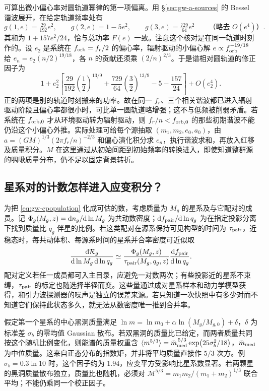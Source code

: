 可算出微小偏心率对圆轨道幂律的第一项偏离。用 \S\ref{sec:gw-a-sources} 的 Bessel 谐波展开，在给定轨道频率处有
\[
 g(1,e)=\tfrac{29}{192}e^2,\qquad
 g(2,e)=1-5e^2,\qquad
 g(3,e)=\tfrac{729}{64}e^2
 \qquad \text{（略去 }O(e^4)\text{）}.
\]
其和为 $1+157e^2/24$，恰与总功率 $F(e)$ 一致。注意这个核对是在同一轨道时刻作的。设 $e_2$ 是系统在 $f_{\rm orb}=f_r/2$ 的偏心率，辐射驱动的小偏心解 $e\propto f_{\rm orb}^{-19/18}$ 给 $e_n=e_2(n/2)^{19/18}$，各 $n$ 的贡献还须乘 $(2/n)^{2/3}$。于是谱相对圆轨道的修正因子为
\[
 1+e_2^2\left[
 \frac{29}{192}\left(\frac12\right)^{13/9}
 +\frac{729}{64}\left(\frac32\right)^{13/9}
 -5-\frac{157}{24}\right]+O(e_2^4).
\]
正的两项是别的轨道时刻搬来的功率。故在同一 $f_r$、三个相关谐波都已进入辐射驱动阶段且偏心率都很小时，可比单一圆轨道略增强；这不与低频被削弱矛盾。若系统在 $f_{{\rm orb},0}$ 才从环境驱动转为辐射驱动，则 $f_r/n<f_{{\rm orb},0}$ 的那些初期谐波不能仍沿这个小偏心外推。实际处理可给每个源抽取 $(m_1,m_2,e_0,a_0)$，由 $a=(GM)^{1/3}(2\pi f_r/n)^{-2/3}$ 和偏心演化积分求 $e_n$，执行谐波求和，再放入红移及质量积分。$M$ 在这里通过从初始间距到初始频率的转换进入，即使知道整群源的啁啾质量分布，仍不足以固定背景转折。

\subsection{星系对的计数怎样进入应变积分？}

为把 \eqref{eq:gw-cpopulation} 化成可估的数，考虑质量为 $M_g$ 的星系及与它配对的成员。记 $\Phi_g(M_g,z)=\dd n_g/\dd\ln M_g$ 为共动数密度；$\dd f_{\rm pair}/\dd\ln q_g$ 为在指定投影分离下找到质量比 $q_g$ 伴星的比例。若这类配对在源系保持可见构型的时间为 $\tau_{\rm pair}$，近稳态时，每共动体积、每源系时间的星系并合率密度可近似取
\[
 \frac{\dd{\cal R}_g}{\dd\ln M_g\,\dd\ln q_g}
 \simeq \frac{\Phi_g(M_g,z)}{\tau_{\rm pair}(M_g,q_g,z)}
             \frac{\dd f_{\rm pair}}{\dd\ln q_g}.
\]
配对定义若任一成员都可入主目录，应避免一对数两次；有些投影近的星系不束缚，$\tau_{\rm pair}$ 的标定也随选择半径而变。这些量通过成对星系样本和动力学模型获得，和引力波探测器的噪声是独立的误差来源。若只知道一次快照中有多少对而不知道它们保持此状态多久，就无法从数密度唯一推到合并率。

假定第一个星系的中心黑洞质量满足 $\ln m=\ln m_0+\alpha\ln(M_g/M_{g,0})+\delta$，$\delta$ 为标准差 $\sigma_b$ 的零均值 Gaussian 散布。若双黑洞的质量比已给定，而两者质量共同按这个随机比例变化，则能谱的质量权重含 $\langle m^{5/3}\rangle=\bar m_{\rm med}^{\,5/3}\exp(25\sigma_b^2/18)$，$\bar m_{\rm med}$ 为中位质量。这来自正态分布的指数矩，并非将平均质量直接作 $5/3$ 次方。例 $\sigma_b=0.3\ln10$ 时，这个因子约为 $1.94$，应变平方受影响比星系数显著。若两颗星的黑洞质量散布独立，质量比也随机，必须对 $\mathcal M^{5/3}=m_1m_2/(m_1+m_2)^{1/3}$ 联合平均；不能仍乘同一个校正因子。

